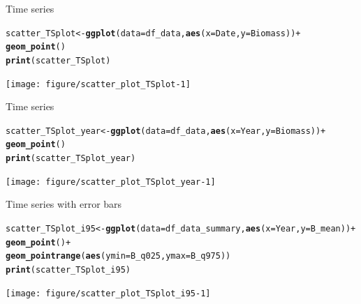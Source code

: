 \documentclass{beamer}\usepackage[]{graphicx}\usepackage[]{color}
\makeatletter
\newcommand{\hlopt}[1]{\textcolor[rgb]{0,0,0}{#1}}%
\newcommand{\hlstd}[1]{\textcolor[rgb]{0.345,0.345,0.345}{#1}}%
\newcommand{\hlkwb}[1]{\textcolor[rgb]{0.69,0.353,0.396}{#1}}%
\newcommand{\hlkwc}[1]{\textcolor[rgb]{0.333,0.667,0.333}{#1}}%
\newcommand{\hlkwd}[1]{\textcolor[rgb]{0.737,0.353,0.396}{\textbf{#1}}}%
\newenvironment{kframe}{%
 \def\at@end@of@kframe{}%
 \ifinner\ifhmode%
  \def\at@end@of@kframe{\end{minipage}}%
  \begin{minipage}{\columnwidth}%
 \fi\fi%
 \def\FrameCommand##1{\hskip\@totalleftmargin \hskip-\fboxsep
 \colorbox{shadecolor}{##1}\hskip-\fboxsep
     \hskip-\linewidth \hskip-\@totalleftmargin \hskip\columnwidth}%
 \MakeFramed {\advance\hsize-\width
   \@totalleftmargin\z@ \linewidth\hsize
   \@setminipage}}%
 {\par\unskip\endMakeFramed%
 \at@end@of@kframe}
\newenvironment{knitrout}{}{} %
\makeatother
\begin{document}
\begin{frame}[fragile]{Time series}
\begin{knitrout}\footnotesize
{}\color{fgcolor}\begin{kframe}
\begin{alltt}
 \hlstd{scatter_TSplot} \hlkwb{<-} \hlkwd{ggplot}\hlstd{(}\hlkwc{data}\hlstd{=df_data,} \hlkwd{aes}\hlstd{(}\hlkwc{x}\hlstd{=Date,} \hlkwc{y}\hlstd{=Biomass))} \hlopt{+}
               \hlkwd{geom_point}\hlstd{()}
 \hlkwd{print}\hlstd{(scatter_TSplot)}
\end{alltt}
\end{kframe}

{\centering \texttt{[image: figure/scatter\_plot\_TSplot-1]} 

}



\end{knitrout}
\end{frame}


\begin{frame}[fragile]{Time series}
\begin{knitrout}\footnotesize
{}\color{fgcolor}\begin{kframe}
\begin{alltt}
 \hlstd{scatter_TSplot_year} \hlkwb{<-} \hlkwd{ggplot}\hlstd{(}\hlkwc{data}\hlstd{=df_data,} \hlkwd{aes}\hlstd{(}\hlkwc{x}\hlstd{=Year,} \hlkwc{y}\hlstd{=Biomass))} \hlopt{+}
                     \hlkwd{geom_point}\hlstd{()}
 \hlkwd{print}\hlstd{(scatter_TSplot_year)}
\end{alltt}
\end{kframe}

{\centering \texttt{[image: figure/scatter\_plot\_TSplot\_year-1]} 

}



\end{knitrout}
\end{frame}


\begin{frame}[fragile]{Time series with error bars}
\begin{knitrout}\footnotesize
{}\color{fgcolor}\begin{kframe}
\begin{alltt}
   \hlstd{scatter_TSplot_i95} \hlkwb{<-} \hlkwd{ggplot}\hlstd{(}\hlkwc{data}\hlstd{=df_data_summary,} \hlkwd{aes}\hlstd{(}\hlkwc{x}\hlstd{=Year,} \hlkwc{y}\hlstd{=B_mean))} \hlopt{+}
               \hlkwd{geom_point}\hlstd{()} \hlopt{+}
               \hlkwd{geom_pointrange}\hlstd{(}\hlkwd{aes}\hlstd{(}\hlkwc{ymin} \hlstd{= B_q025,} \hlkwc{ymax} \hlstd{= B_q975))}
   \hlkwd{print}\hlstd{(scatter_TSplot_i95)}
\end{alltt}
\end{kframe}

{\centering \texttt{[image: figure/scatter\_plot\_TSplot\_i95-1]} 

}



\end{knitrout}
\end{frame}
\end{document}
